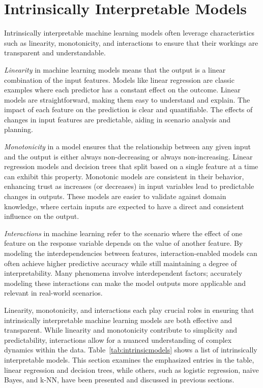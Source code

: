 
\section{Intrinsically Interpretable Models}

Intrinsically interpretable machine learning models often leverage characteristics such as linearity, monotonicity, and interactions to ensure that their workings are transparent and understandable.

\emph{Linearity} in machine learning models means that the output is a linear combination of the input features. Models like linear regression are classic examples where each predictor has a constant effect on the outcome. Linear models are straightforward, making them easy to understand and explain. The impact of each feature on the prediction is clear and quantifiable. The effects of changes in input features are predictable, aiding in scenario analysis and planning.

\emph{Monotonicity} in a model ensures that the relationship between any given input and the output is either always non-decreasing or always non-increasing. Linear regression models and decision trees that split based on a single feature at a time can exhibit this property. Monotonic models are consistent in their behavior, enhancing trust as increases (or decreases) in input variables lead to predictable changes in outputs. These models are easier to validate against domain knowledge, where certain inputs are expected to have a direct and consistent influence on the output.

\emph{Interactions} in machine learning refer to the scenario where the effect of one feature on the response variable depends on the value of another feature. By modeling the interdependencies between features, interaction-enabled models can often achieve higher predictive accuracy while still maintaining a degree of interpretability. Many phenomena involve interdependent factors; accurately modeling these interactions can make the model outputs more applicable and relevant in real-world scenarios.

Linearity, monotonicity, and interactions each play crucial roles in ensuring that intrinsically interpretable machine learning models are both effective and transparent. While linearity and monotonicity contribute to simplicity and predictability, interactions allow for a nuanced understanding of complex dynamics within the data. Table~\ref{tab:intrinsicmodels} shows a list of intrinsically interpretable models. This section examines the emphasized entries in the table, linear regression and decision trees, while others, such as logistic regression, naive Bayes, and k-NN, have been presented and discussed in previous sections.


